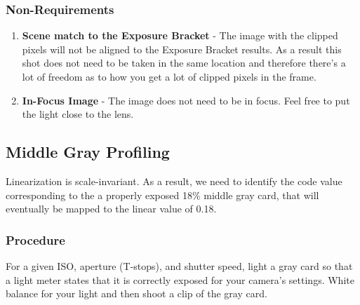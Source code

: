 \documentclass[twoside]{article}
\begin{document}
\subsubsection{Non-Requirements}
\begin{enumerate}
    \item \textbf{Scene match to the Exposure Bracket} - The image with the clipped pixels will not be aligned to the Exposure Bracket results. As a result this shot does not need to be taken in the same location and therefore there's a lot of freedom as to how you get a lot of clipped pixels in the frame.
    \item \textbf{In-Focus Image} - The image does not need to be in focus. Feel free to put the light close to the lens.
\end{enumerate}

\subsection{Middle Gray Profiling}
Linearization is scale-invariant. As a result, we need to identify the code value corresponding to the a properly exposed 18\% middle gray card, that will eventually be mapped to the linear value of 0.18.

\subsubsection{Procedure}
For a given ISO, aperture (T-stops), and shutter speed, light a gray card so that a light meter states that it is correctly exposed for your camera's settings. White balance for your light and then shoot a clip of the gray card.
\end{document}
